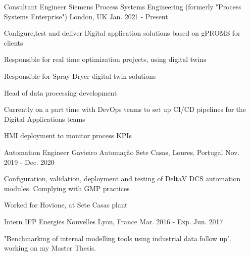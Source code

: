 

\begin{cventries}

  \cventry
    {Consultant Engineer} %
    {Siemens Process Systems Engineering (formerly "Process Systems Enterprise")} %
    {London, UK} %
    {Jan. 2021 - Present} %
    {
      \begin{cvitems} %
        \item {Configure,test and deliver Digital application solutions based on gPROMS for clients}
        \item {Responsible for real time optimization projects, using digital twins}
        \item {Responsible for Spray Dryer digital twin solutions}
        \item {Head of data processing development}
        \item {Currently on a part time with DevOps teams to set up CI/CD pipelines for the Digital Applications teams}
        \item {HMI deployment to monitor process KPIs}
      \end{cvitems}
    }

  \cventry
    {Automation Engineer} %
    {Gavieiro Automação} %
    {Sete Casas, Loures, Portugal} %
    {Nov. 2019 - Dec. 2020} %
    {
      \begin{cvitems} %
        \item {Configuration, validation, deployment and testing of DeltaV DCS automation modules. Complying with GMP practices}
        \item {Worked for Hovione, at Sete Casas plant}
      \end{cvitems}
    }

  \cventry
    {Intern} %
    {IFP Energies Nouvelles} %
    {Lyon, France} %
    {Mar. 2016 - Exp. Jun. 2017} %
    {
      \begin{cvitems} %
        \item {"Benchmarking of internal modelling tools using industrial data follow up", working on my Master Thesis.}
      \end{cvitems}
    }


\end{cventries}
